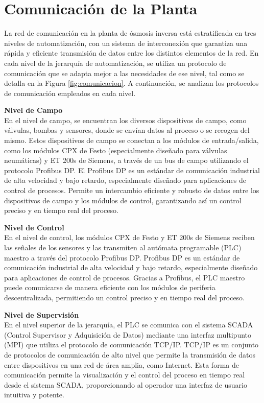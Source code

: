 \section{Comunicación de la Planta}

La red de comunicación en la planta de ósmosis inversa está
estratificada en tres niveles de automatización, con un sistema
de interconexión que garantiza una rápida y eficiente transmisión
de datos entre los distintos elementos de la red. En cada nivel
de la jerarquía de automatización, se utiliza un protocolo de
comunicación que se adapta mejor a las necesidades
de ese nivel, tal como se detalla en la Figura \ref{fig:comunicacion}.
A continuación, se analizan los protocolos de comunicación empleados
en cada nivel.

\textbf{Nivel de Campo}\\
En el nivel de campo, se encuentran los diversos dispositivos de campo,
como válvulas, bombas y sensores, donde se envían datos al proceso o se recogen del
mismo. Estos dispositivos de campo se conectan a los módulos de
entrada/salida, como los módulos CPX de Festo (especialmente diseñado para válvulas neumáticas) y ET 200s de Siemens,
a través de un bus de campo utilizando el protocolo Profibus DP.
El Profibus DP es un estándar de comunicación industrial de alta
velocidad y bajo retardo, especialmente diseñado para aplicaciones
de control de procesos. Permite un intercambio eficiente y robusto
de datos entre los dispositivos de campo y los módulos de control,
garantizando así un control preciso y en tiempo real del proceso.

\textbf{Nivel de Control}\\
En el nivel de control, los módulos CPX de Festo y ET 200s de
Siemens reciben las señales de los sensores y las transmiten al
autómata programable (PLC) maestro a través del protocolo Profibus DP.
Profibus DP es un estándar de comunicación industrial de alta velocidad
y bajo retardo, especialmente diseñado para aplicaciones de control de
procesos. Gracias a Profibus, el PLC maestro puede comunicarse de manera
eficiente con los módulos de periferia descentralizada,
permitiendo un control preciso y en tiempo real del proceso.

\textbf{Nivel de Supervisión}\\
En el nivel superior de la jerarquía, el PLC se comunica con el sistema SCADA (Control Supervisor y Adquisición de Datos) mediante una interfaz multipunto (MPI) que utiliza el protocolo de comunicación TCP/IP. TCP/IP es un conjunto de protocolos de comunicación de alto nivel que permite la transmisión de datos entre dispositivos en una red de área amplia, como Internet. Esta forma de comunicación permite la visualización y el control del proceso en tiempo real desde el sistema SCADA, proporcionando al operador una interfaz de usuario intuitiva y potente.

